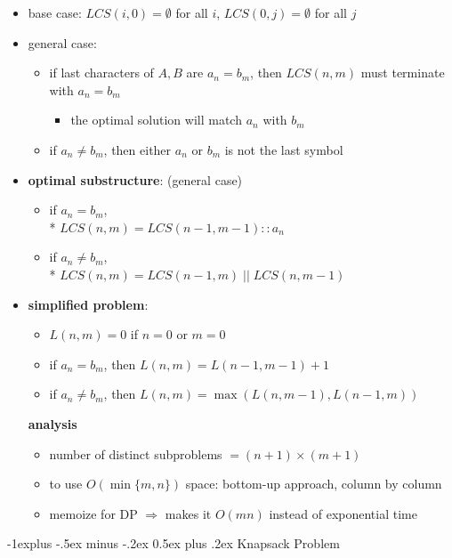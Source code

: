 \documentclass[10pt, landscape]{article}
\makeatletter
\renewcommand{\subsection}{\@startsection{subsection}{2}{0mm}%
  {-1explus -.5ex minus -.2ex}%
  {0.5ex plus .2ex}%
{\normalfont\normalsize\bfseries}}
\makeatother
\begin{document}
\begin{multicols*}{4}
  \begin{itemize}
    \item base case: $LCS(i, 0) = \emptyset$ for all $i$, $LCS(0, j) = \emptyset$ for all $j$ 
    \item general case:
      \begin{itemize}
        \item if last characters of $A, B$ are $a_n = b_m$, then $LCS(n, m)$ must terminate with $a_n=b_m$ 
          \begin{itemize}
            \item the optimal solution will match $a_n$ with $b_m$
          \end{itemize}
        \item if $a_n \neq b_m$, then either $a_n$ or $b_m$ is not the last symbol
      \end{itemize}
    \item \textbf{optimal substructure}: (general case)
      \begin{itemize}
        \item if $a_n = b_m$,
          \\* $LCS(n, m) = LCS(n-1, m-1) :: a_n$
        \item if $a_n \neq b_m$, 
          \\* $LCS(n, m) = LCS(n-1, m) \; || \; LCS(n, m-1)$
      \end{itemize}
    \item \textbf{simplified problem}: 
      \begin{itemize}
        \item $L(n, m) = 0$ if $n=0$ or $m=0$ 
        \item if $a_n = b_m$, then $L(n, m) = L(n-1, m-1) + 1$ 
        \item if $a_n \neq b_m$, then $L(n, m) = \max (L(n, m-1), L(n-1, m)) $
      \end{itemize}
      \textbf{analysis}
      \begin{itemize}
        \item number of distinct subproblems $= (n+1) \times (m+1)$
        \item to use $O(\min \{m, n\})$ space: bottom-up approach, column by column 
        \item memoize for DP $\Rightarrow$ makes it $O(mn)$ instead of exponential time
      \end{itemize}
  \end{itemize}

  \subsection{Knapsack Problem}


\end{multicols*}
\end{document}
